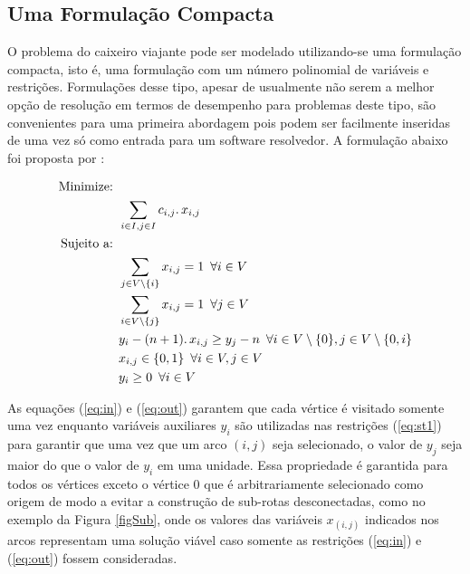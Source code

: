 \documentclass[a4paper,11pt,fleqn]{article}
\begin{document}
\subsection{Uma Formulação Compacta}

O problema do caixeiro viajante pode ser modelado utilizando-se uma
formulação compacta, isto é, uma formulação com um número polinomial
de variáveis e restrições. Formulações desse tipo, apesar de usualmente não serem a melhor opção de resolução em termos de desempenho para problemas
deste tipo, são convenientes para uma primeira abordagem pois podem
ser facilmente inseridas de uma vez só como entrada para um software
resolvedor. A formulação abaixo foi proposta por \cite{Miller1960}:

\begin{align}
    \textrm{Minimize: }   & \nonumber \\
    &  \sum_{i \in I, j \in I} c_{i,j} \ldotp x_{i,j} \\
    \textrm{Sujeito a: }   & \nonumber \\
    & \sum_{j \in V \setminus \{i\}} x_{i,j} = 1 \,\,\, \forall i \in V \label{eq:in}  \\
    & \sum_{i \in V \setminus \{j\}} x_{i,j} = 1 \,\,\, \forall j \in V \label{eq:out} \\
    & y_{i} -(n+1)\ldotp x_{i,j} \geq y_{j} -n  \,\,\, \forall i \in V\setminus \{0\}, j \in V\setminus \{0,i\} \label{eq:st1} \\
    & x_{i,j} \in \{0,1\} \,\,\, \forall i \in V, j \in V \\
    & y_i \geq 0 \,\,\, \forall i \in V 
\end{align}

As equações (\ref{eq:in}) e (\ref{eq:out}) garantem que cada vértice
é visitado somente uma vez enquanto variáveis auxiliares $y_{i}$
são utilizadas nas restrições (\ref{eq:st1}) para garantir que uma vez
que um arco $(i,j)$ seja selecionado, o valor de $y_{j}$ seja maior
do que o valor de $y_{i}$ em uma unidade. Essa propriedade é garantida
para todos os vértices exceto o vértice 0 que é arbitrariamente selecionado
como origem de modo a evitar a construção de sub-rotas desconectadas,
como no exemplo da Figura \ref{figSub}, onde os valores das variáveis
$x_{(i,j)}$ indicados nos arcos representam uma solução viável caso
somente as restrições (\ref{eq:in}) e (\ref{eq:out}) fossem consideradas.
\end{document}

